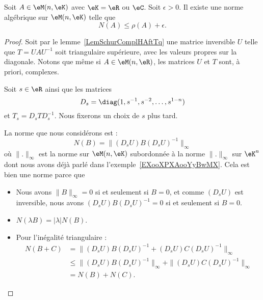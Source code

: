 \begin{lemma}        \label{LEMooGBLJooCPvxNl}
	Soit \( A\in \eM(n,\eK)\) avec \( \eK=\eR\) ou \( \eC\). Soit \( \epsilon>0\). Il existe une norme algébrique sur \( \eM(n,\eK)\) telle que
	\begin{equation}
		N(A)\leq \rho(A)+\epsilon.
	\end{equation}
\end{lemma}

\begin{proof}
	Soit par le lemme~\ref{LemSchurComplHAftTq} une matrice inversible \( U\) telle que \( T=UAU^{-1}\) soit triangulaire supérieure, avec les valeurs propres sur la diagonale. Notons que même si \( A\in \eM(n,\eR)\), les matrices \( U\) et \( T\) sont, à priori, complexes.

	Soit \( s\in \eR\) ainsi que les matrices
	\begin{equation}
		D_s=\diag(1,s^{-1},s^{-2},\ldots, s^{1-n})
	\end{equation}
	et \( T_s=D_sTD_s^{-1}\). Nous fixerons un choix de \( s\) plus tard.

	La norme que nous considérons est :
	\begin{equation}
		N(B)=\| (D_sU)B(D_sU)^{-1} \|_{\infty}
	\end{equation}
	où \( \| . \|_{\infty}\) est la norme sur \( \eM(n,\eK)\) subordonnée à la norme \( \| . \|_{\infty}\) sur \( \eK^n\) dont nous avons déjà parlé dans l'exemple~\ref{EXooXPXAooYyBwMX}. Cela est bien une norme parce que
	\begin{itemize}
		\item Nous avons \( \| B \|_{\infty}=0\) si et seulement si \( B=0\), et comme \( (D_sU)\) est inversible, nous avons \( (D_sU)B(D_sU)^{-1}=0\) si et seulement si \( B=0\).
		\item \( N(\lambda B)=| \lambda |N(B)\).
		\item Pour l'inégalité triangulaire :
		      \begin{subequations}
			      \begin{align}
				      N(B+C) & =\| (D_sU)B(D_sU)^{-1}+(D_sU)C(D_sU)^{-1} \|_{\infty}                     \\
				             & \leq  \| (D_sU)B(D_sU)^{-1}\|_{\infty} +\| (D_sU)C(D_sU)^{-1} \|_{\infty} \\
				             & =N(B)+N(C).
			      \end{align}
		      \end{subequations}
	\end{itemize}


\end{proof}
